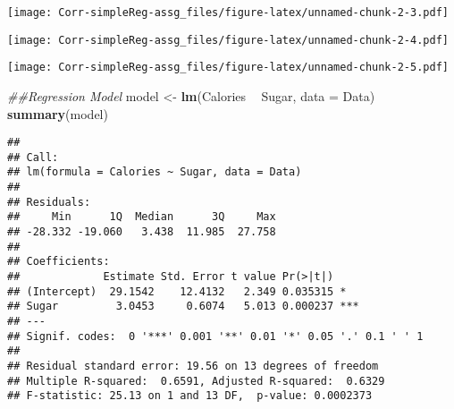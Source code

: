 \documentclass[]{article}
\newenvironment{Shaded}{\begin{snugshade}}{\end{snugshade}}
\newcommand{\CommentTok}[1]{\textcolor[rgb]{0.56,0.35,0.01}{\textit{#1}}}
\newcommand{\DataTypeTok}[1]{\textcolor[rgb]{0.13,0.29,0.53}{#1}}
\newcommand{\KeywordTok}[1]{\textcolor[rgb]{0.13,0.29,0.53}{\textbf{#1}}}
\newcommand{\NormalTok}[1]{#1}
\newcommand{\OperatorTok}[1]{\textcolor[rgb]{0.81,0.36,0.00}{\textbf{#1}}}
\newcommand{\StringTok}[1]{\textcolor[rgb]{0.31,0.60,0.02}{#1}}
\begin{document}
\texttt{[image: Corr-simpleReg-assg\_files/figure-latex/unnamed-chunk-2-3.pdf]}

\begin{Shaded}
\end{Shaded}

\texttt{[image: Corr-simpleReg-assg\_files/figure-latex/unnamed-chunk-2-4.pdf]}

\begin{Shaded}
\end{Shaded}

\texttt{[image: Corr-simpleReg-assg\_files/figure-latex/unnamed-chunk-2-5.pdf]}

\begin{Shaded}
\begin{Highlighting}[]
\CommentTok{##Regression Model}
\NormalTok{model <-}\StringTok{ }\KeywordTok{lm}\NormalTok{(Calories }\OperatorTok{~}\StringTok{ }\NormalTok{Sugar, }\DataTypeTok{data =}\NormalTok{ Data)}
\KeywordTok{summary}\NormalTok{(model)}
\end{Highlighting}
\end{Shaded}

\begin{verbatim}
## 
## Call:
## lm(formula = Calories ~ Sugar, data = Data)
## 
## Residuals:
##     Min      1Q  Median      3Q     Max 
## -28.332 -19.060   3.438  11.985  27.758 
## 
## Coefficients:
##             Estimate Std. Error t value Pr(>|t|)    
## (Intercept)  29.1542    12.4132   2.349 0.035315 *  
## Sugar         3.0453     0.6074   5.013 0.000237 ***
## ---
## Signif. codes:  0 '***' 0.001 '**' 0.01 '*' 0.05 '.' 0.1 ' ' 1
## 
## Residual standard error: 19.56 on 13 degrees of freedom
## Multiple R-squared:  0.6591, Adjusted R-squared:  0.6329 
## F-statistic: 25.13 on 1 and 13 DF,  p-value: 0.0002373
\end{verbatim}
\end{document}
